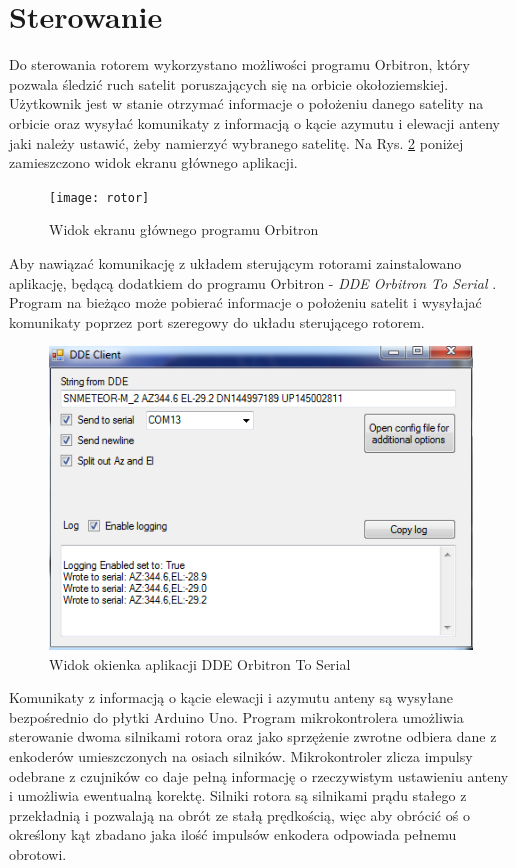 \section{Sterowanie}

Do sterowania rotorem wykorzystano możliwości programu Orbitron, który pozwala śledzić ruch satelit poruszających się na orbicie okołoziemskiej. Użytkownik jest w stanie otrzymać informacje o położeniu danego satelity na orbicie oraz wysyłać komunikaty z informacją o kącie azymutu i elewacji anteny jaki należy ustawić, żeby namierzyć wybranego satelitę. Na Rys. \ref{fig:rotor} poniżej zamieszczono widok ekranu głównego aplikacji. 

\begin{figure}[h]
	\centering
		\texttt{[image: rotor]}
	\caption{Widok ekranu głównego programu Orbitron}	
	\label{fig:rotor}
\end{figure}

Aby nawiązać komunikację z układem sterującym rotorami zainstalowano aplikację, będącą dodatkiem do programu Orbitron - \textit{DDE Orbitron To Serial} \cite{dde}. Program na bieżąco może pobierać informacje o położeniu satelit i wysyłajać komunikaty poprzez port szeregowy do układu sterującego rotorem.


\begin{figure}[h]
	\centering
		\includegraphics[width=0.7 \textwidth]{DDEOrbitronToSerialScreenShot}
	\caption{Widok okienka aplikacji DDE Orbitron To Serial}	
	\label{fig:rotor}
\end{figure}

Komunikaty z informacją o kącie elewacji i azymutu anteny są wysyłane bezpośrednio do płytki Arduino Uno. Program mikrokontrolera umożliwia sterowanie dwoma silnikami rotora oraz jako sprzężenie zwrotne odbiera dane z enkoderów umieszczonych na osiach silników. Mikrokontroler zlicza impulsy odebrane z czujników co daje pełną informację o rzeczywistym ustawieniu anteny i umożliwia ewentualną korektę. Silniki rotora są silnikami prądu stałego z przekładnią i pozwalają na obrót ze stałą prędkością, więc aby obrócić oś o określony kąt zbadano jaka ilość impulsów enkodera odpowiada pełnemu obrotowi. 